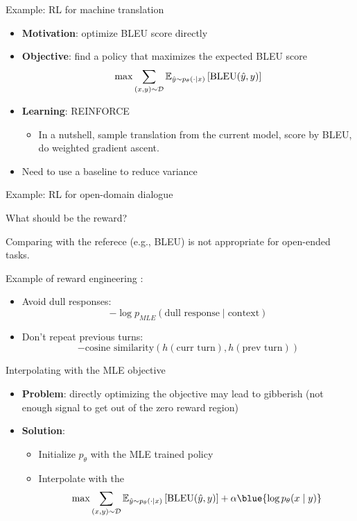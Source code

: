 \documentclass[usenames,dvipsnames,notes,11pt,aspectratio=169,hyperref={colorlinks=true, linkcolor=blue}]{beamer}
\begin{document}
\begin{frame}{Example: RL for machine translation}{}
    \begin{itemize}
        \itemsep1em
        \item {\bf Motivation}: optimize BLEU score directly
        \item {\bf Objective}: find a policy that maximizes the expected BLEU score
            $$
            \max \sum_{(x,y)\sim \mathcal{D}}\mathbb{E}_{\hat{y}\sim p_\theta(\cdot\mid x)}\left[ \text{BLEU}(\hat{y},y) \right]
            $$
        \item {\bf Learning}: REINFORCE
            \begin{itemize}
                \item In a nutshell, sample translation from the current model, score by BLEU, do weighted gradient ascent.
            \end{itemize}
        \item Need to use a baseline to reduce variance
    \end{itemize}
\end{frame}

\begin{frame}
    {Example: RL for open-domain dialogue}

    What should be the reward?

    Comparing with the referece (e.g., BLEU) is not appropriate for open-ended tasks.

    \pause
    Example of reward engineering :
    \begin{itemize}
        \item Avoid dull responses:
            $$
            -\log p_{MLE}(\text{dull response} \mid \text{context})
            $$
        \item Don't repeat previous turns:
            $$
            -\text{cosine similarity}(h(\text{curr turn}), h(\text{prev turn}))
            $$
    \end{itemize}
\end{frame}


\begin{frame}
    {Interpolating with the MLE objective}
    \begin{itemize}
        \itemsep1em
        \item {\bf Problem}: directly optimizing the objective may lead to gibberish (not enough signal to get out of the zero reward region)
            \pause
        \item {\bf Solution}:
            \begin{itemize}
                \item Initialize $p_\theta$ with the MLE trained policy
                \item Interpolate with the 
                    $$
                    \max \sum_{(x,y)\sim \sD}\BE_{\hat{y}\sim p_\theta(\cdot\mid x)}\pb{\text{BLEU}(\hat{y},y)}
                    + \alpha \blue{\log p_\theta(x\mid y)}
                    $$
            \end{itemize}
    \end{itemize}
\end{frame}
\end{document}
